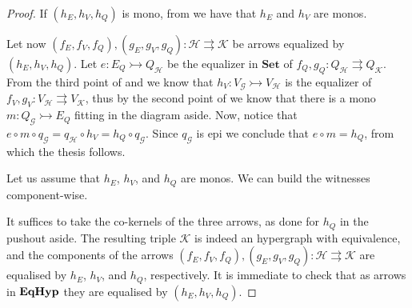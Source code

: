 \documentclass[a4paper,UKenglish,cleveref,pdftex,thm-restate,numberwithinsect]{lipics-v2021}
\newcommand{\Set}{\mathbf{Set}}
\newcommand{\catname}[1]{\textbf{\textup{#1}}}
\newcommand{\EqHyp}{\catname{EqHyp}} %
\newcommand{\mto}{\rightarrowtail}
\begin{document}
\mn*

\begin{proof}\label{proof:regmono}
	If $(h_E, h_V, h_Q)$ is mono, from  we have that $h_E$ and $h_V$ are monos.
	\parbox{11cm}{
	Let now $(f_E, f_V, f_Q), (g_E, g_V, g_Q): \mathcal{H\rightrightarrows K}$ be arrows equalized by $(h_E, h_V, h_Q)$. Let $e\colon E_Q\mto Q_{\mathcal{H}}$ be the equalizer in
	$\Set$ of $f_Q, g_Q\colon Q_{\mathcal{H}}\rightrightarrows Q_{\mathcal{K}}$. From the third point of  and  we know that $h_V\colon V_{\mathcal{G}}\mto V_{\mathcal{H}} $ 
	is the equalizer of $f_V, g_V\colon V_{\mathcal{H}}\rightrightarrows V_{\mathcal{K}}$, thus by the second point of  we know that there is a mono 
	$m\colon Q_{\mathcal{G}}\mto E_Q$ fitting in the diagram aside. Now, notice that 
	$e\circ m\circ q_{\mathcal{G}}=q_\mathcal{H}\circ h_V=h_{Q}\circ q_{\mathcal{G}}$.
	Since $q_{\mathcal{G}}$ is epi we conclude that $e\circ m=h_Q$, from which the thesis follows.}
	\hfill
	\parbox{2cm}{}   
	
	Let us assume that $h_E$, $h_V$, and $h_Q$  are monos. 
	We can build the witnesses component-wise.
	\parbox{11cm}{It suffices to take the co-kernels of the three arrows, as done 
	for $h_Q$ in the pushout aside. The resulting triple $\mathcal{K}$ is indeed an hypergraph 
	with equivalence, and the components of the arrows 
	$(f_E, f_V, f_Q), (g_E, g_V, g_Q): \mathcal{H\rightrightarrows K}$ 
	are equalised by $h_E$, $h_V$, and $h_Q$, respectively. It is immediate to check that as
	arrows in $\EqHyp$ they are equalised by $(h_E, h_V, h_Q)$.
	} \hfill
	\parbox{2cm}{
         }   
\end{proof}
\end{document}
